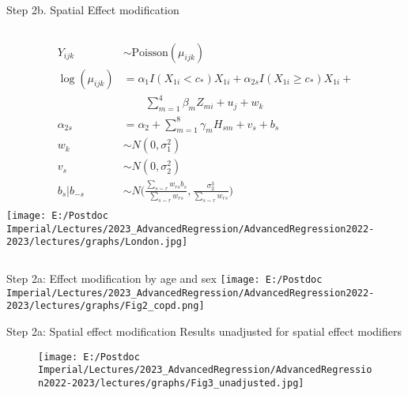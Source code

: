 \documentclass{beamer}
\begin{document}
\begin{frame}{Step 2b. Spatial Effect modification}
	\vspace{-1cm}
	{\small
		\begin{columns}
			\begin{align*}
			Y_{ijk} & \sim \text{Poisson}(\mu_{ijk}) \nonumber\\
			\log(\mu_{ijk}) & = \alpha_1 I(X_{1i}< c_*)X_{1i} + \alpha_{2s} I(X_{1i}\geq c_*)X_{1i} + \\ &  \quad\quad \sum_{m=1}^4\beta_mZ_{mi} + u_{j} + w_k\nonumber\\
			\alpha_{2s} &= \alpha_2 + \sum_{m=1}^8 \gamma_m H_{sm} + v_s + b_s \nonumber\\
			w_k & \sim N(0, \sigma_1^2)\nonumber\\
			v_s &\sim N(0, \sigma_2^2)\nonumber\\
			b_s|b_{-s} &\sim N\bigg(\frac{\sum_{s \sim r} w_{rs} b_s}{\sum_{s \sim r} w_{rs}},        \frac{\sigma^3_2}{\sum_{s \sim r} w_{rs}}\bigg) \nonumber\\
			\end{align*} 
			\texttt{[image: E:/Postdoc Imperial/Lectures/2023\_AdvancedRegression/AdvancedRegression2022-2023/lectures/graphs/London.jpg]}
		\end{columns}
	}
	
\end{frame}


\begin{frame}{Step 2a: Effect modification by age and sex}
	\vspace{-0.5cm}
	\centering
	\texttt{[image: E:/Postdoc Imperial/Lectures/2023\_AdvancedRegression/AdvancedRegression2022-2023/lectures/graphs/Fig2\_copd.png]} 
\end{frame}

\begin{frame}{Step 2a: Spatial effect modification}
	Results unadjusted for spatial effect modifiers
	\begin{figure}
		\centering
		\texttt{[image: E:/Postdoc Imperial/Lectures/2023\_AdvancedRegression/AdvancedRegression2022-2023/lectures/graphs/Fig3\_unadjusted.jpg]} 
	\end{figure}
\end{frame}
\end{document}

